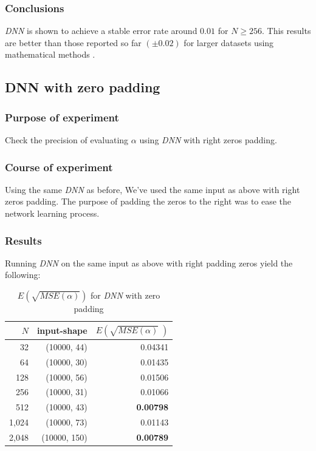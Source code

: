 \documentclass[a4paper, 12pt]{report}
\begin{document}
\subsubsection{Conclusions}
\textit{DNN} is shown to achieve a stable error rate around $0.01$ for $N \geq 256$. This results are better than those reported so far $(\pm 0.02)$ for larger datasets using mathematical methods \cite{newman}. 

\subsection{DNN with zero padding}

\subsubsection{Purpose of experiment}
Check the precision of evaluating $\alpha$ using \textit{DNN} with right zeros padding.

\subsubsection{Course of experiment}
Using the same \textit{DNN} as before, We've used the same input as above with right zeros padding.
The purpose of padding the zeros to the right was to ease the network learning process.

\subsubsection{Results}
Running \textit{DNN} on the same input as above with right padding zeros yield the following:
\begin{table}[h!]
    \centering
    \begin{tabular}{r r r} 
        $N$ & input-shape & $E\left(\sqrt{MSE(\alpha)}\;\right)$ \\
        \hline
        32 & (10000, 44) & 0.04341 \\ 
        64 & (10000, 30) & 0.01435 \\
        128 & (10000, 56) & 0.01506 \\
        256 & (10000, 31) & 0.01066 \\
        \rowcolor{yellow}
        512 & (10000, 43) & \textbf{0.00798} \\ 
        1,024 & (10000, 73) & 0.01143 \\ 
        \rowcolor{yellow}
        2,048 & (10000, 150) & \textbf{0.00789} \\ 
    \end{tabular}
    \caption{$E\left(\sqrt{MSE(\alpha)}\right)$ for \textit{DNN} with zero padding}
    \label{table:dnn-zero-sqrt-mse}
\end{table}
\end{document}
